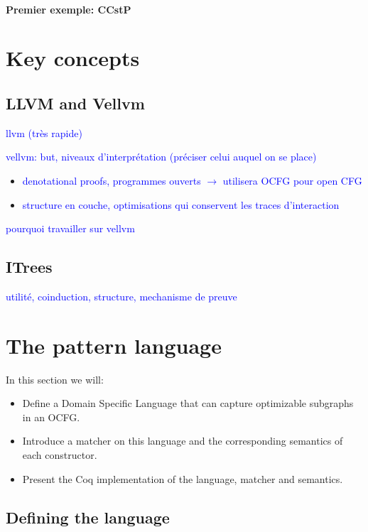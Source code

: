 \documentclass[11pt]{article}
\newcommand{\leon}[1]{\textcolor{blue}{#1}}
\begin{document}
\paragraph{Premier exemple: CCstP}

\section{Key concepts}
\label{sec:concepts}

\subsection{LLVM and Vellvm}

\leon{llvm (très rapide)}

\leon{vellvm: but, niveaux d'interprétation (préciser celui auquel on se place)}

\begin{itemize}
  \item \leon{denotational proofs, programmes ouverts $\rightarrow$ utilisera OCFG pour open CFG}
  \item \leon{structure en couche, optimisations qui conservent les traces d'interaction}
\end{itemize}

\leon{pourquoi travailler sur vellvm}

\subsection{ITrees}

\leon{utilité, coinduction, structure, mechanisme de preuve}

\section{The pattern language}
\label{sec:lang}

In this section we will:\begin{itemize}
  \item Define a Domain Specific Language that can capture optimizable subgraphs in an OCFG\@.
  \item Introduce a matcher on this language and the corresponding semantics of each constructor.
  \item Present the Coq implementation of the language, matcher and semantics.
\end{itemize}

\subsection{Defining the language}
\end{document}
